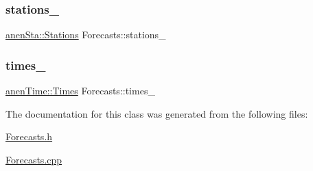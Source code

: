 \subsubsection{\texorpdfstring{stations\+\_\+}{stations\_}}
{\footnotesize\ttfamily \mbox{\hyperlink{classanen_sta_1_1_stations}{anen\+Sta\+::\+Stations}} Forecasts\+::stations\+\_\+\hspace{0.3cm}{\ttfamily [protected]}}

\mbox{\label{class_forecasts_a5db6d70382b21bc6621b7765d21f6d61}} 
\subsubsection{\texorpdfstring{times\+\_\+}{times\_}}
{\footnotesize\ttfamily \mbox{\hyperlink{classanen_time_1_1_times}{anen\+Time\+::\+Times}} Forecasts\+::times\+\_\+\hspace{0.3cm}{\ttfamily [protected]}}



The documentation for this class was generated from the following files\+:\begin{DoxyCompactItemize}
\item 
\mbox{\hyperlink{_forecasts_8h}{Forecasts.\+h}}\item 
\mbox{\hyperlink{_forecasts_8cpp}{Forecasts.\+cpp}}\end{DoxyCompactItemize}
